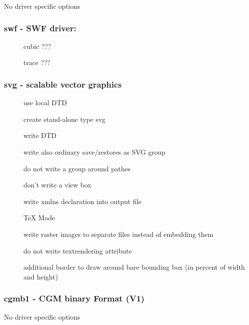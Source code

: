\documentclass[english,a4paper]{article}
\begin{document}
No driver specific options
\subsubsection{swf - SWF driver: }
\begin{description}
\item[] 
cubic ???


\item[] 
trace ???


\end{description}
\subsubsection{svg - scalable vector graphics}
\begin{description}
\item[] 
use local DTD


\item[] 
create stand-alone type svg


\item[] 
write DTD


\item[] 
write also ordinary save/restores as SVG group


\item[] 
do not write a group around pathes


\item[] 
don't write a view box


\item[] 
write xmlns declaration into output file


\item[] 
TeX Mode


\item[] 
write raster images to separate files instead of embedding them


\item[] 
do not write textrendering attribute


\item[] 
additional border to draw around bare bounding box (in percent of width and height)


\end{description}
\subsubsection{cgmb1 - CGM binary Format (V1)}
No driver specific options
\end{document}
